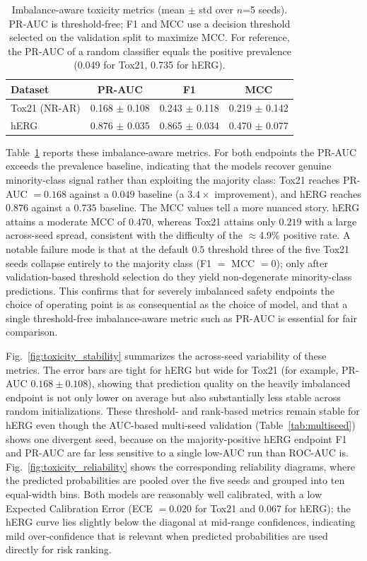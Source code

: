 \documentclass[journal]{IEEEtran}
\begin{document}
\begin{table}[!t]
\centering
\caption{Imbalance-aware toxicity metrics (mean $\pm$ std over $n$=5 seeds). PR-AUC is threshold-free; F1 and MCC use a decision threshold selected on the validation split to maximize MCC. For reference, the PR-AUC of a random classifier equals the positive prevalence (0.049 for Tox21, 0.735 for hERG).}
\label{tab:imbalance_metrics}
\small
\setlength{\tabcolsep}{4pt}
\begin{tabular}{lccc}
\toprule
\textbf{Dataset} & \textbf{PR-AUC} & \textbf{F1} & \textbf{MCC} \\
\midrule
Tox21 (NR-AR) & 0.168 $\pm$ 0.108 & 0.243 $\pm$ 0.118 & 0.219 $\pm$ 0.142 \\
hERG & 0.876 $\pm$ 0.035 & 0.865 $\pm$ 0.034 & 0.470 $\pm$ 0.077 \\
\bottomrule
\end{tabular}
\end{table}

Table~\ref{tab:imbalance_metrics} reports these imbalance-aware metrics. For both endpoints the PR-AUC exceeds the prevalence baseline, indicating that the models recover genuine minority-class signal rather than exploiting the majority class: Tox21 reaches PR-AUC $=0.168$ against a $0.049$ baseline (a $3.4\times$ improvement), and hERG reaches $0.876$ against a $0.735$ baseline. The MCC values tell a more nuanced story. hERG attains a moderate MCC of $0.470$, whereas Tox21 attains only $0.219$ with a large across-seed spread, consistent with the difficulty of the $\approx$4.9\% positive rate. A notable failure mode is that at the default $0.5$ threshold three of the five Tox21 seeds collapse entirely to the majority class (F1 $=$ MCC $=0$); only after validation-based threshold selection do they yield non-degenerate minority-class predictions. This confirms that for severely imbalanced safety endpoints the choice of operating point is as consequential as the choice of model, and that a single threshold-free imbalance-aware metric such as PR-AUC is essential for fair comparison.

Fig.~\ref{fig:toxicity_stability} summarizes the across-seed variability of these metrics. The error bars are tight for hERG but wide for Tox21 (for example, PR-AUC $0.168 \pm 0.108$), showing that prediction quality on the heavily imbalanced endpoint is not only lower on average but also substantially less stable across random initializations. These threshold- and rank-based metrics remain stable for hERG even though the AUC-based multi-seed validation (Table~\ref{tab:multiseed}) shows one divergent seed, because on the majority-positive hERG endpoint F1 and PR-AUC are far less sensitive to a single low-AUC run than ROC-AUC is. Fig.~\ref{fig:toxicity_reliability} shows the corresponding reliability diagrams, where the predicted probabilities are pooled over the five seeds and grouped into ten equal-width bins. Both models are reasonably well calibrated, with a low Expected Calibration Error (ECE $=0.020$ for Tox21 and $0.067$ for hERG); the hERG curve lies slightly below the diagonal at mid-range confidences, indicating mild over-confidence that is relevant when predicted probabilities are used directly for risk ranking.
\end{document}
